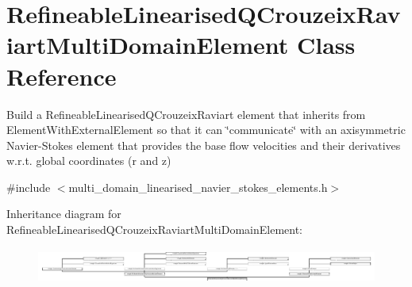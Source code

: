 \hypertarget{classRefineableLinearisedQCrouzeixRaviartMultiDomainElement}{}\section{Refineable\+Linearised\+Q\+Crouzeix\+Raviart\+Multi\+Domain\+Element Class Reference}
\label{classRefineableLinearisedQCrouzeixRaviartMultiDomainElement}


Build a Refineable\+Linearised\+Q\+Crouzeix\+Raviart element that inherits from Element\+With\+External\+Element so that it can \char`\"{}communicate\char`\"{} with an axisymmetric Navier-\/\+Stokes element that provides the base flow velocities and their derivatives w.\+r.\+t. global coordinates (r and z)  




{\ttfamily \#include $<$multi\+\_\+domain\+\_\+linearised\+\_\+navier\+\_\+stokes\+\_\+elements.\+h$>$}

Inheritance diagram for Refineable\+Linearised\+Q\+Crouzeix\+Raviart\+Multi\+Domain\+Element\+:\begin{figure}[H]
\begin{center}
\leavevmode
\includegraphics[height=1.193182cm]{classRefineableLinearisedQCrouzeixRaviartMultiDomainElement}
\end{center}
\end{figure}
